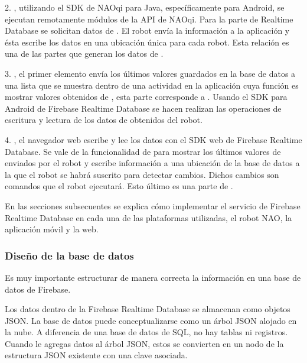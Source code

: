 2. , utilizando el SDK de NAOqi para Java,
específicamente para Android, se ejecutan remotamente módulos de la API de NAOqi.
Para la parte de Realtime Database se solicitan datos de . El robot
envía la información a la aplicación y ésta escribe los datos en una ubicación
única para cada robot. Esta relación es una de las partes que generan los datos
de .

3. , el primer elemento
envía los últimos valores guardados en la base de datos a una lista que se muestra
dentro de una actividad en la aplicación cuya función es mostrar valores
obtenidos de , esta parte corresponde a . Usando
el SDK para Android de Firebase Realtime Database se hacen realizan las
operaciones de escritura y lectura de los datos de 
obtenidos del robot.

4. , el navegador web escribe y
lee los datos con el SDK web de Firebase Realtime Database. Se vale de
la funcionalidad de  para mostrar los últimos valores de 
enviados por el robot y escribe información a una ubicación de la base de
datos a la que el robot se habrá suscrito para detectar cambios. Dichos cambios
son comandos que el robot ejecutará. Esto último es una parte de
.

En las secciones subsecuentes se explica cómo implementar el servicio de
Firebase Realtime Database en cada una de las plataformas utilizadas, el robot
NAO, la aplicación móvil y la web.


\subsubsection{Diseño de la base de datos}
\label{\detokenize{chapter_two/desc_cloudnao:diseno-de-la-base-de-datos}}
Es muy importante estructurar de manera correcta la información en una base
de datos de Firebase.

Los datos dentro de la Firebase Realtime Database se almacenan como objetos
JSON. La base de datos puede conceptualizarse como un árbol JSON alojado en la
nube. A diferencia de una base de datos de SQL, no hay tablas ni registros.
Cuando le agregas datos al árbol JSON, estos se convierten en un nodo de la
estructura JSON existente con una clave asociada.

